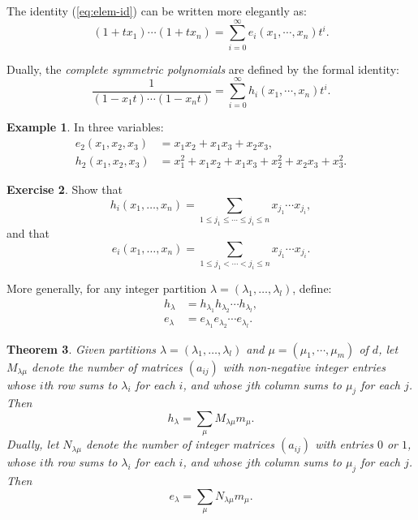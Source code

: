 \documentclass[11pt]{amsproc}
\newtheorem{theorem}{Theorem}[subsection]
\theoremstyle{definition}
\theoremstyle{example}
\newtheorem{example}[theorem]{Example}
\newtheorem{exercise}[theorem]{Exercise}
\begin{document}
The identity (\ref{eq:elem-id}) can be written more elegantly as:
\begin{displaymath}
  (1+t x_1) \dotsb (1+tx_n) = \sum_{i=0}^\infty e_i(x_1,\dotsb, x_n)t^i.
\end{displaymath}

Dually, the \emph{complete symmetric polynomials} are defined by the formal identity:
\begin{displaymath}
  \frac 1{(1-x_1t)\dotsb (1-x_nt)} = \sum_{i=0}^\infty h_i(x_1,\dotsb, x_n)t^i.
\end{displaymath}
\begin{example}
  In three variables:
  \begin{align*}
    e_2(x_1,x_2,x_3) & = x_1x_2 + x_1x_3 + x_2x_3,\\
    h_2(x_1,x_2,x_3) & = x_1^2 + x_1x_2 + x_1x_3 + x_2^2 + x_2x_3 + x_3^2.
  \end{align*}
\end{example}
\begin{exercise}
  Show that
  \begin{displaymath}
    h_i(x_1,\dotsc, x_n) = \sum_{1\leq j_1\leq \dotsb \leq j_i\leq n} x_{j_1}\dotsb x_{j_i},
  \end{displaymath}
  and that
  \begin{displaymath}
    e_i(x_1,\dotsc, x_n) = \sum_{1\leq j_1< \dotsb < j_i\leq n} x_{j_1}\dotsb x_{j_i}.
  \end{displaymath}
\end{exercise}
More generally, for any integer partition $\lambda=(\lambda_1,\dotsc, \lambda_l)$, define:
\begin{align*}
  h_\lambda &= h_{\lambda_1} h_{\lambda_2}\dotsb h_{\lambda_l},\\
  e_\lambda &= e_{\lambda_1} e_{\lambda_2}\dotsb e_{\lambda_l}.
\end{align*}
\begin{theorem}
  Given partitions $\lambda=(\lambda_1,\dotsc,\lambda_l)$ and $\mu=(\mu_1,\dotsb, \mu_m)$ of $d$, let $M_{\lambda\mu}$ denote the number of matrices $(a_{ij})$ with non-negative integer entries whose $i$th row sums to $\lambda_i$ for each $i$, and whose $j$th column sums to $\mu_j$ for each $j$.
  Then
  \begin{displaymath}
    h_\lambda = \sum_\mu M_{\lambda\mu} m_\mu.
  \end{displaymath}
  Dually, let $N_{\lambda\mu}$ denote the number of integer matrices $(a_{ij})$ with entries $0$ or $1$, whose $i$th row sums to $\lambda_i$ for each $i$, and whose $j$th column sums to $\mu_j$ for each $j$.
  Then
  \begin{displaymath}
    e_\lambda = \sum_\mu N_{\lambda\mu} m_\mu.
  \end{displaymath}
\end{theorem}
\end{document}
